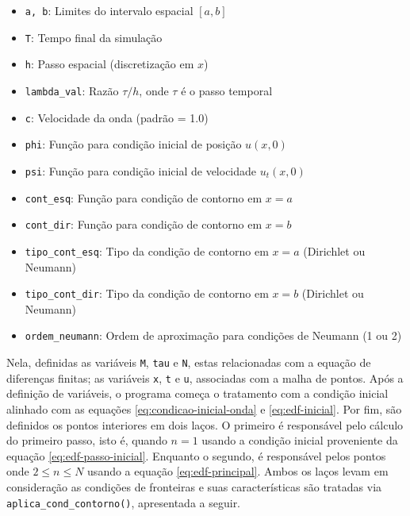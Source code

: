 \documentclass[column,amsmath,amssymb,floatfix]{revtex4}
\begin{document}
\begin{itemize}
	\item \texttt{a, b}: Limites do intervalo espacial $[a,b]$
	\item \texttt{T}: Tempo final da simulação
	\item \texttt{h}: Passo espacial (discretização em $x$)
	\item \texttt{lambda\_val}: Razão $\tau/h$, onde $\tau$ é o passo temporal 
	\item \texttt{c}: Velocidade da onda (padrão = 1.0)
	\item \texttt{phi}: Função para condição inicial de posição $u(x,0)$
	\item \texttt{psi}: Função para condição inicial de velocidade $u_t(x,0)$
	\item \texttt{cont\_esq}: Função para condição de contorno em $x=a$
	\item \texttt{cont\_dir}: Função para condição de contorno em $x=b$
	\item \texttt{tipo\_cont\_esq}: Tipo da condição de contorno em $x=a$ (Dirichlet ou Neumann)
	\item \texttt{tipo\_cont\_dir}: Tipo da condição de contorno em $x=b$ (Dirichlet ou Neumann)
	\item \texttt{ordem\_neumann}: Ordem de aproximação para condições de Neumann (1 ou 2)
\end{itemize}

Nela, definidas as variáveis \texttt{M}, \texttt{tau} e \texttt{N}, estas relacionadas com a equação de diferenças finitas; as variáveis \texttt{x}, \texttt{t} e \texttt{u}, associadas com a malha de pontos. Após a definição de variáveis, o programa começa o tratamento com a condição inicial alinhado com as equações \eqref{eq:condicao-inicial-onda} e \eqref{eq:edf-inicial}. Por fim, são definidos os pontos interiores em dois laços. O primeiro é responsável pelo cálculo do primeiro passo, isto é, quando $n=1$ usando a condição inicial proveniente da equação \eqref{eq:edf-passo-inicial}. Enquanto o segundo, é responsável pelos pontos onde $2 \leq n \leq N$ usando a equação \eqref{eq:edf-principal}. Ambos os laços levam em consideração as condições de fronteiras e suas características são tratadas via \texttt{aplica\_cond\_contorno()}, apresentada a seguir.
\end{document}
